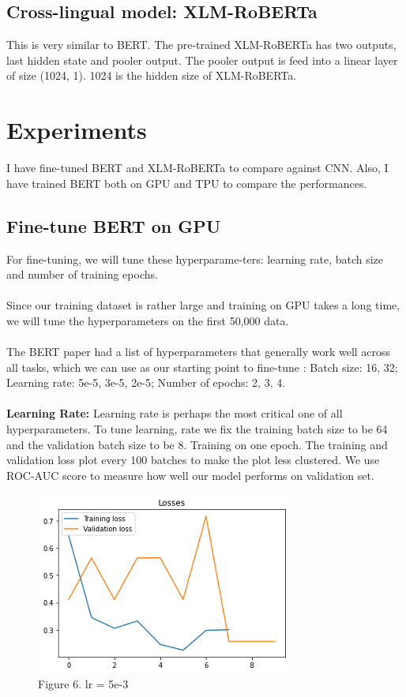 \documentclass[11pt,a4paper]{article}
\begin{document}
\subsection{Cross-lingual model: XLM-RoBERTa}

This is very similar to BERT. The pre-trained XLM-RoBERTa has two outputs, last hidden state and pooler output. The pooler output is feed into a linear layer of size (1024, 1). 1024 is the hidden size of XLM-RoBERTa.

\section{Experiments}

I have fine-tuned BERT and XLM-RoBERTa to compare against CNN. Also, I have trained BERT both on GPU and TPU to compare the performances.\\

\subsection{Fine-tune BERT on GPU}

For fine-tuning, we will tune these hyperparame-ters: learning rate, batch size and number of training epochs.\\
\\
Since our training dataset is rather large and training on GPU takes a long time, we will tune the hyperparameters on the first 50,000 data.\\
\\
The BERT paper had a list of hyperparameters that generally work well across all tasks, which we can use as our starting point to fine-tune \cite{BERT}: 
Batch size: 16, 32; Learning rate: 5e-5, 3e-5, 2e-5; Number of epochs: 2, 3, 4.\\
\\
\textbf {Learning Rate:} Learning rate is perhaps the most critical one of all hyperparameters. To tune learning, rate we fix the training batch size to be 64 and the validation batch size to be 8. Training on one epoch. The training and validation loss plot every 100 batches to make the plot less clustered. We use ROC-AUC score to measure how well our model performs on validation set.\\

\begin{figure}[!htb]
	\centering
	\includegraphics{figures/figure6.png}
	\caption{\label{fig:my-label} Figure 6. lr = 5e-3}
\end{figure}
\end{document}
